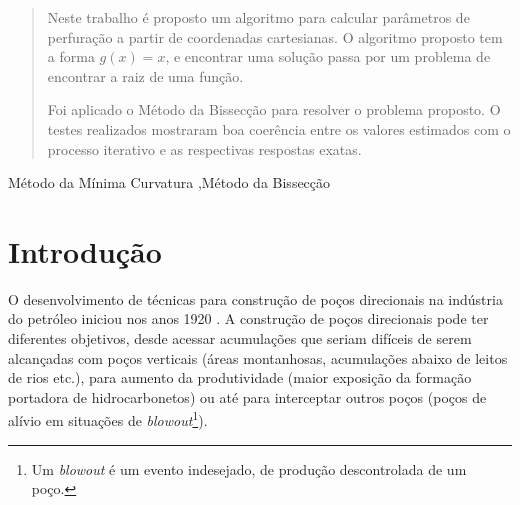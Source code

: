 \documentclass[final,3p,12pt]{elsarticle}
\begin{document}
\begin{frontmatter}
\begin{abstract}
    Neste trabalho é proposto um algoritmo para calcular parâmetros de perfuração a partir de coordenadas cartesianas. O algoritmo proposto tem a forma $g(x)=x$, e encontrar uma solução passa por um problema de encontrar a raiz de uma função. 

    Foi aplicado o Método da Bissecção para resolver o problema proposto. O testes realizados mostraram boa coerência entre os valores estimados com o processo iterativo e as respectivas respostas exatas.

\end{abstract}




\begin{keyword}
    Método da Mínima Curvatura \sep Método da Bissecção 



\end{keyword}

\end{frontmatter}


\section{Introdução}

O desenvolvimento de técnicas para construção de poços direcionais na indústria do petróleo iniciou nos anos 1920 \cite{international2015iadc}. A construção de poços direcionais pode ter diferentes objetivos, desde acessar acumulações que seriam difíceis de serem alcançadas com poços verticais (áreas montanhosas, acumulações abaixo de leitos de rios etc.), para aumento da produtividade (maior exposição da formação portadora de hidrocarbonetos) ou até para interceptar outros poços (poços de alívio em situações de \emph{blowout}\footnote{Um \emph{blowout} é um evento indesejado, de produção descontrolada de um poço.}).
\end{document}

